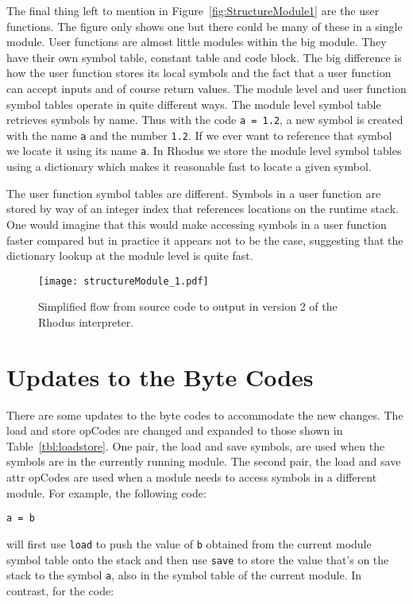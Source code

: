 The final thing left to mention in Figure~\ref{fig:StructureModule1} are the user functions. The figure only shows one but there could be many of these in a single module. User functions are almost little modules within the big module. They have their own symbol table, constant table and code block. The big difference is how the user function stores its local symbols and the fact that a user function can accept inputs and of course return values. The module level and user function symbol tables operate in quite different ways. The module level symbol table retrieves symbols by name. Thus with the code {\tt a = 1.2}, a new symbol is created with the name {\tt a} and the number {\tt 1.2}. If we ever want to reference that symbol we locate it using its name {\tt a}. In Rhodus we store the module level symbol tables using a dictionary which makes it reasonable fast to locate a given symbol.

The user function symbol tables are different. Symbols in a user function are stored by way of an integer index that references locations on the runtime stack. One would imagine that this would make accessing symbols in a user function faster compared but in practice it appears not to be the case, suggesting that the dictionary lookup at the module level is quite fast.

\begin{figure}[htpb]
\centering
\texttt{[image: structureModule\_1.pdf]}
\caption{Simplified flow from source code to output in version 2 of the Rhodus interpreter.}
\label{fig:StructureModule2}
\end{figure}

\section{Updates to the Byte Codes}

There are some updates to the byte codes to accommodate the new changes. The load and store opCodes are changed and expanded to those shown in Table~\ref{tbl:loadstore}. One pair, the load and save symbols, are used when the symbols are in the currently running module. The second pair, the load and save attr opCodes are used when a module needs to access symbols in a different module. For example, the following code:

\begin{lstlisting}
a = b
\end{lstlisting}

will first use {\tt load} to push the value of {\tt b} obtained from the current module symbol table onto the stack and then use {\tt save} to store the value that's on the stack to the symbol {\tt a}, also in the symbol table of the current module. In contrast, for the code:

